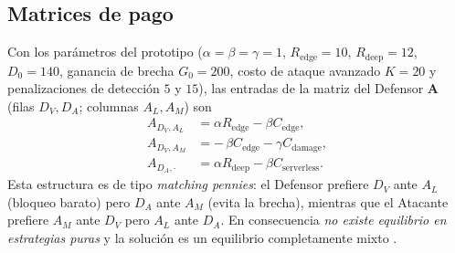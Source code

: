 \documentclass[10pt,twocolumn]{article}
\begin{document}
\subsection{Matrices de pago}
Con los par\'ametros del prototipo ($\alpha=\beta=\gamma=1$, $R_{\text{edge}}=10$,
$R_{\text{deep}}=12$, $D_0=140$, ganancia de brecha $G_0=200$, costo de ataque
avanzado $K=20$ y penalizaciones de detecci\'on $5$ y $15$), las entradas de la
matriz del Defensor $\mathbf{A}$ (filas $D_V,D_A$; columnas $A_L,A_M$) son
\begin{align}
A_{D_V,A_L} &= \alpha R_{\text{edge}} - \beta C_{\text{edge}}, \\
A_{D_V,A_M} &= -\,\beta C_{\text{edge}} - \gamma C_{\text{damage}}, \\
A_{D_A,\cdot} &= \alpha R_{\text{deep}} - \beta C_{\text{serverless}}.
\end{align}
Esta estructura es de tipo \emph{matching pennies}: el Defensor prefiere $D_V$ ante
$A_L$ (bloqueo barato) pero $D_A$ ante $A_M$ (evita la brecha), mientras que el
Atacante prefiere $A_M$ ante $D_V$ pero $A_L$ ante $D_A$. En consecuencia \emph{no
existe equilibrio en estrategias puras} y la soluci\'on es un equilibrio
completamente mixto \cite{manshaei}.
\end{document}
